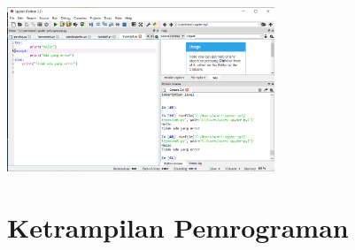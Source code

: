        \paragraph{}
        \centerline{\includegraphics[width=8cm]{gambar/tryexcept.PNG}}

\section{Ketrampilan Pemrograman}
